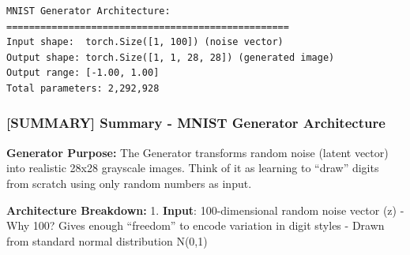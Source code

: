 \documentclass[11pt]{article}
\begin{document}
    \begin{Verbatim}[commandchars=\\\{\}]
MNIST Generator Architecture:
==================================================
Input shape:  torch.Size([1, 100]) (noise vector)
Output shape: torch.Size([1, 1, 28, 28]) (generated image)
Output range: [-1.00, 1.00]
Total parameters: 2,292,928
    \end{Verbatim}

    \subsubsection{{[}SUMMARY{]} Summary - MNIST Generator
Architecture}\label{summary-summary---mnist-generator-architecture}

\textbf{Generator Purpose:} The Generator transforms random noise
(latent vector) into realistic 28x28 grayscale images. Think of it as
learning to ``draw'' digits from scratch using only random numbers as
input.

\textbf{Architecture Breakdown:} 1. \textbf{Input}: 100-dimensional
random noise vector (z) - Why 100? Gives enough ``freedom'' to encode
variation in digit styles - Drawn from standard normal distribution
N(0,1)
\end{document}
